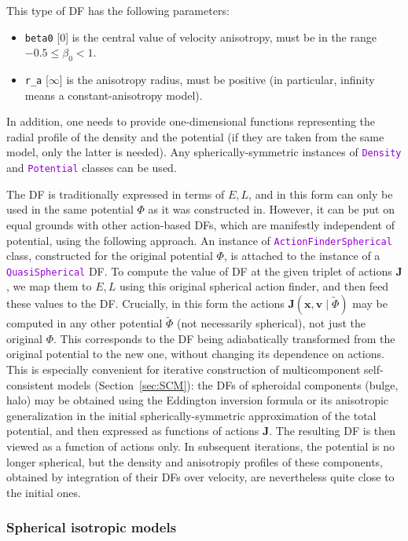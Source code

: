 \documentclass[12pt]{article}
\newcommand{\ttt}[1]{\textcolor{darkviolet}{\texttt{#1}}}
\newcommand{\ppp}[1]{\textcolor{darkolive} {\texttt{#1}}}
\newcommand{\bv}{\boldsymbol{v}}
\newcommand{\bx}{\boldsymbol{x}}
\newcommand{\bJ}{\boldsymbol{J}}
\begin{document}
This type of DF has the following parameters:
\begin{itemize}
\item \ppp{beta0} [0]  is the central value of velocity anisotropy, must be in the range $-0.5 \le \beta_0 < 1$.
\item \ppp{r_a} [$\infty$]  is the anisotropy radius, must be positive (in particular, infinity means a constant-anisotropy model).
\end{itemize}
In addition, one needs to provide one-dimensional functions representing the radial profile of the density and the potential (if they are taken from the same model, only the latter is needed). Any spherically-symmetric instances of \ttt{Density} and \ttt{Potential} classes can be used.

The DF is traditionally expressed in terms of $E,L$, and in this form can only be used in the same potential $\Phi$ as it was constructed in. However, it can be put on equal grounds with other action-based DFs, which are manifestly independent of potential, using the following approach.
An instance of \ttt{ActionFinderSpherical} class, constructed for the original potential $\Phi$, is attached to the instance of a \ttt{QuasiSpherical} DF. To compute the value of DF at the given triplet of actions $\bJ$, we map them to $E,L$ using this original spherical action finder, and then feed these values to the DF. Crucially, in this form the actions $\bJ(\bx,\bv \;|\;\tilde\Phi)$ may be computed in any other potential $\tilde\Phi$ (not necessarily spherical), not just the original $\Phi$. This corresponds to the DF being adiabatically transformed from the original potential to the new one, without changing its dependence on actions.
This is especially convenient for iterative construction of multicomponent self-consistent models (Section~\ref{sec:SCM}): the DFs of spheroidal components (bulge, halo) may be obtained using the Eddington inversion formula or its anisotropic generalization in the initial spherically-symmetric approximation of the total potential, and then expressed as functions of actions $\bJ$. The resulting DF is then viewed as a function of actions only. In subsequent iterations, the potential is no longer spherical, but the density and anisotropiy profiles of these components, obtained by integration of their DFs over velocity, are nevertheless quite close to the initial ones.

\subsubsection{Spherical isotropic models}  \label{sec:DFsphericalIsotropic}
\end{document}
